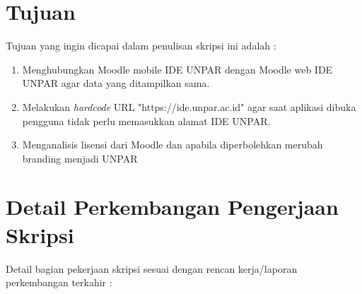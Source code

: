 \documentclass[a4paper,twoside]{article}
\begin{document}
\section{Tujuan}
Tujuan yang ingin dicapai dalam penulisan skripsi ini adalah :
\begin{enumerate}
	\item Menghubungkan Moodle mobile IDE UNPAR dengan Moodle web IDE UNPAR agar data yang ditampilkan sama.
	\item Melakukan \textit{hardcode} URL "https://ide.unpar.ac.id" agar saat aplikasi dibuka pengguna tidak perlu memasukkan alamat IDE UNPAR.
	\item Menganalisis lisensi dari Moodle dan apabila diperbolehkan merubah branding menjadi UNPAR
\end{enumerate}

\section{Detail Perkembangan Pengerjaan Skripsi}
Detail bagian pekerjaan skripsi sesuai dengan rencan kerja/laporan perkembangan terkahir :
\end{document}
